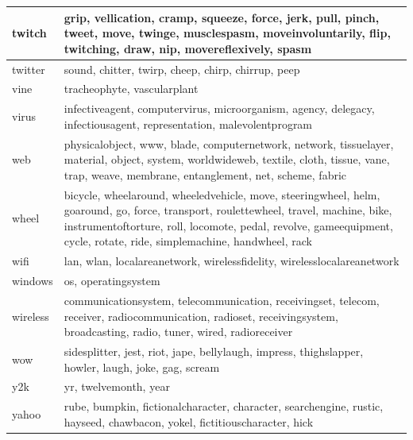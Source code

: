 \documentclass[12pt,a4paper]{report}
\begin{document}
\begin{table}[H]
\begin{center}
\begin{tabular}{|l|l|}
\hline
twitch & grip, vellication, cramp, squeeze, force, jerk, pull, pinch, tweet, move, twinge, musclespasm, moveinvoluntarily, flip, twitching, draw, nip, movereflexively, spasm\\
\hline
twitter & sound, chitter, twirp, cheep, chirp, chirrup, peep\\
\hline
vine & tracheophyte, vascularplant\\
\hline
virus & infectiveagent, computervirus, microorganism, agency, delegacy, infectiousagent, representation, malevolentprogram\\
\hline
web & physicalobject, www, blade, computernetwork, network, tissuelayer, material, object, system, worldwideweb, textile, cloth, tissue, vane, trap, weave, membrane, entanglement, net, scheme, fabric\\
\hline
wheel & bicycle, wheelaround, wheeledvehicle, move, steeringwheel, helm, goaround, go, force, transport, roulettewheel, travel, machine, bike, instrumentoftorture, roll, locomote, pedal, revolve, gameequipment, cycle, rotate, ride, simplemachine, handwheel, rack\\
\hline
wifi & lan, wlan, localareanetwork, wirelessfidelity, wirelesslocalareanetwork\\
\hline
windows & os, operatingsystem\\
\hline
wireless & communicationsystem, telecommunication, receivingset, telecom, receiver, radiocommunication, radioset, receivingsystem, broadcasting, radio, tuner, wired, radioreceiver\\
\hline
wow & sidesplitter, jest, riot, jape, bellylaugh, impress, thighslapper, howler, laugh, joke, gag, scream\\
\hline
y2k & yr, twelvemonth, year\\
\hline
yahoo & rube, bumpkin, fictionalcharacter, character, searchengine, rustic, hayseed, chawbacon, yokel, fictitiouscharacter, hick\\
\hline


\end{tabular}
\end{center}
\end{table}
\end{document}
